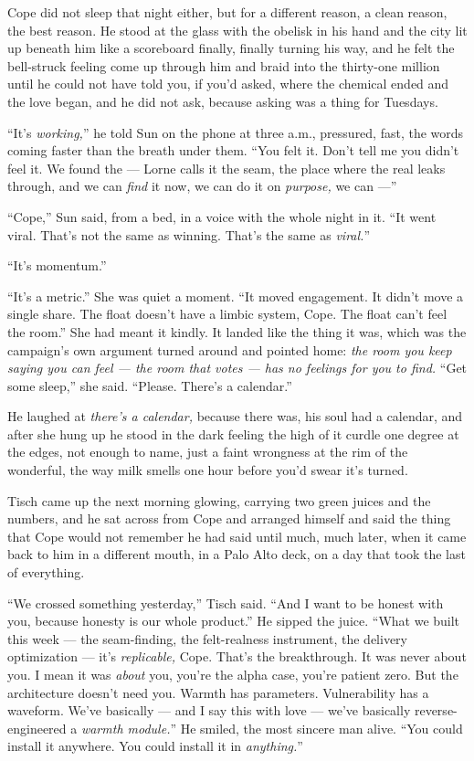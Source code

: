 \documentclass[11pt,openany]{book}
\newcommand{\scenebreak}{\par\vspace{0.5\baselineskip}\begin{center}\textasteriskcentered\quad\textasteriskcentered\quad\textasteriskcentered\end{center}\vspace{0.5\baselineskip}\par}
\begin{document}
Cope did not sleep that night either, but for a different reason, a clean reason, the best reason. He stood at the glass with the obelisk in his hand and the city lit up beneath him like a scoreboard finally, finally turning his way, and he felt the bell-struck feeling come up through him and braid into the thirty-one million until he could not have told you, if you'd asked, where the chemical ended and the love began, and he did not ask, because asking was a thing for Tuesdays.

``It's \textit{working,}'' he told Sun on the phone at three a.m., pressured, fast, the words coming faster than the breath under them. ``You felt it. Don't tell me you didn't feel it. We found the --- Lorne calls it the seam, the place where the real leaks through, and we can \textit{find} it now, we can do it on \textit{purpose,} we can ---''

``Cope,'' Sun said, from a bed, in a voice with the whole night in it. ``It went viral. That's not the same as winning. That's the same as \textit{viral.}''

``It's momentum.''

``It's a metric.'' She was quiet a moment. ``It moved engagement. It didn't move a single share. The float doesn't have a limbic system, Cope. The float can't feel the room.'' She had meant it kindly. It landed like the thing it was, which was the campaign's own argument turned around and pointed home: \textit{the room you keep saying you can feel --- the room that votes --- has no feelings for you to find.} ``Get some sleep,'' she said. ``Please. There's a calendar.''

He laughed at \textit{there's a calendar,} because there was, his soul had a calendar, and after she hung up he stood in the dark feeling the high of it curdle one degree at the edges, not enough to name, just a faint wrongness at the rim of the wonderful, the way milk smells one hour before you'd swear it's turned.


\scenebreak


Tisch came up the next morning glowing, carrying two green juices and the numbers, and he sat across from Cope and arranged himself and said the thing that Cope would not remember he had said until much, much later, when it came back to him in a different mouth, in a Palo Alto deck, on a day that took the last of everything.

``We crossed something yesterday,'' Tisch said. ``And I want to be honest with you, because honesty is our whole product.'' He sipped the juice. ``What we built this week --- the seam-finding, the felt-realness instrument, the delivery optimization --- it's \textit{replicable,} Cope. That's the breakthrough. It was never about you. I mean it was \textit{about} you, you're the alpha case, you're patient zero. But the architecture doesn't need you. Warmth has parameters. Vulnerability has a waveform. We've basically --- and I say this with love --- we've basically reverse-engineered a \textit{warmth module.}'' He smiled, the most sincere man alive. ``You could install it anywhere. You could install it in \textit{anything.}''
\end{document}
